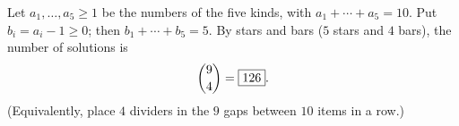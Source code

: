Let $a_1,\dots,a_5\ge1$ be the numbers of the five kinds, with $a_1+\cdots+a_5=10$. Put $b_i=a_i-1\ge0$; then $b_1+\cdots+b_5=5$. By stars and bars ($5$ stars and $4$ bars), the number of solutions is
\[
\dbinom{9}{4}=\boxed{126}.
\]
(Equivalently, place $4$ dividers in the $9$ gaps between $10$ items in a row.)
